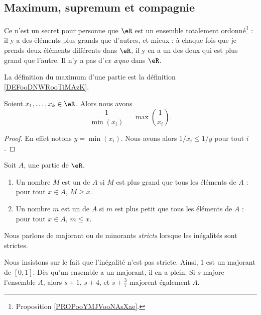 \subsection{Maximum, supremum et compagnie}

Ce n'est un secret pour personne que \( \eR\) est un ensemble totalement ordonné\footnote{Proposition \ref{PROPooYMJVooNAsXae}.} : il y a des éléments plus grands que d'autres, et mieux : à chaque fois que je prends deux éléments différents dans \( \eR\), il y en a un des deux qui est plus grand que l'autre. Il n'y a pas d'\emph{ex æquo} dans \( \eR\).

La définition du maximum d'une partie est la définition \ref{DEFooDNWRooTiMAzK}.

\begin{proposition}
	Soient \( x_1,\ldots,x_k\in \eR\). Alors nous avons
	\begin{equation}
		\frac{1}{ \min(x_i)}=\max\left( \frac{1}{ x_i} \right).
	\end{equation}
\end{proposition}

\begin{proof}
	En effet notons \( y=\min(x_i)\). Nous avons alors \( 1/x_i\leq 1/y\) pour tout \( i\).
\end{proof}

\begin{definition}
	Soit \( A\), une partie de \( \eR\).
	\begin{enumerate}
		\item
		      Un nombre \( M\) est un  de \( A\) si \( M\) est plus grand que tous les éléments de \( A\) : pour tout \( x\in A\), \( M\geq x\).
		\item
		      Un nombre \( m\) est un  de \( A\) si \( m\) est plus petit que tous les éléments de \( A\) : pour tout \( x\in A\), \( m\leq x\).
	\end{enumerate}
	Nous parlons de majorant ou de minorants \emph{stricts} lorsque les inégalités sont strictes.
\end{definition}

Nous insistons sur le fait que l'inégalité n'est pas stricte. Ainsi, \( 1\) est un majorant de \( [0,1]\). Dès qu'un ensemble a un majorant, il en a plein. Si \( s\) majore l'ensemble \( A\), alors \( s+1\), \( s+4\), et \( s+\frac{ 3 }{ 7 }\) majorent également \( A\).

